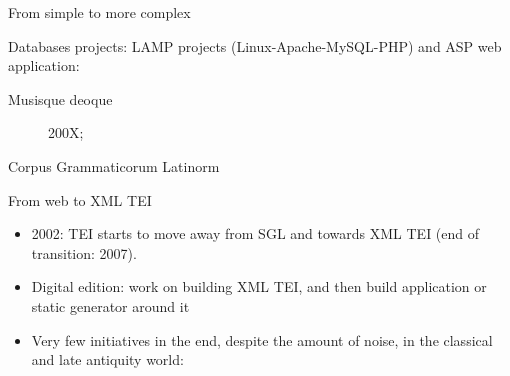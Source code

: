 \documentclass[aspectratio=169]{beamer}
\begin{document}
\begin{frame}{From simple to more complex}

Databases projects: LAMP projects (Linux-Apache-MySQL-PHP) and ASP web application:

\begin{description}
    \item[Musisque deoque] 200X;
    \item[Corpus Grammaticorum Latinorm]
\end{description}
    
\end{frame}

\begin{frame}{From web to XML TEI}

\begin{itemize}
    \item 2002: TEI starts to move away from SGL and towards XML TEI (end of transition: 2007).
    \item Digital edition: work on building XML TEI, and then build application or static generator around it
    \item Very few initiatives in the end, despite the amount of noise, in the classical and late antiquity world:
\end{itemize}
\end{frame}
\end{document}
